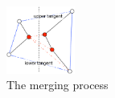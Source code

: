 \documentclass{article}
\begin{document}
\begin{description}
  \begin{figure}[h]
  \centering
  \includegraphics[width=0.2\textwidth]{hw74tangents}
  \caption{The merging process}
  \label{fig:pb4}
  \end{figure}

\end{description}
\end{document}
